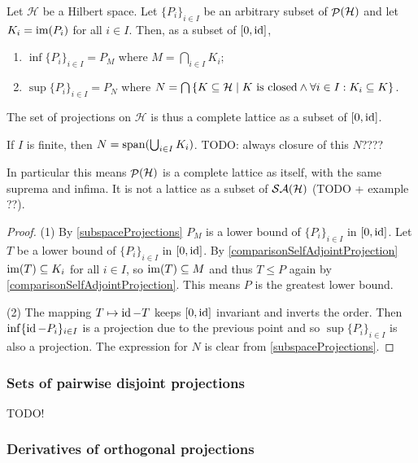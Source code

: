 \begin{proposition}
Let $\mathcal{H}$ be a Hilbert space. Let $\{P_i\}_{i\in I}$ be an arbitrary subset of $\mathop{\mathcal{P}}\nolimits(\mathcal{H})$ and let $K_i = \operatorname{im}(P_i)$ for all $i\in I$. Then, as a subset of $[0,\operatorname{id}]$,
\begin{enumerate}
\item $\inf \{P_i\}_{i\in I} = P_M$ where $M = \bigcap_{i\in I}K_i$;
\item $\sup \{P_i\}_{i\in I} = P_N$ where $N = \bigcap\left\{ K \subseteq \mathcal{H} \;\middle|\; \text{$K$ is closed} \land \forall i\in I: K_i \subseteq K \right\}$.
\end{enumerate}
The set of projections on $\mathcal{H}$ is thus a complete lattice as a subset of $[0,\operatorname{id}]$.

If $I$ is finite, then $N = \operatorname{span}(\bigcup_{i\in I}K_i)$. TODO: always closure of this $N$????
\end{proposition}
In particular this means $\mathop{\mathcal{P}}\nolimits(\mathcal{H})$ is a complete lattice as itself, with the same suprema and infima. It is not a lattice as a subset of $\mathop{\mathcal{SA}}\nolimits(\mathcal{H})$ (TODO + example ??).
\begin{proof}
(1) By \ref{subspaceProjections} $P_M$ is a lower bound of $\{P_i\}_{i\in I}$ in $[0,\operatorname{id}]$. Let $T$ be a lower bound of $\{P_i\}_{i\in I}$ in $[0,\operatorname{id}]$. By \ref{comparisonSelfAdjointProjection} $\operatorname{im}(T)\subseteq K_i$ for all $i\in I$, so $\operatorname{im}(T)\subseteq M$ and thus $T\leq P$ again by \ref{comparisonSelfAdjointProjection}. This means $P$ is the greatest lower bound.

(2) The mapping $T\mapsto \operatorname{id}-T$ keeps $[0,\operatorname{id}]$ invariant and inverts the order. Then $\inf \{\operatorname{id} - P_i\}_{i\in I}$ is a projection due to the previous point and so $\sup \{P_i\}_{i\in I}$ is also a projection. The expression for $N$ is clear from \ref{subspaceProjections}.
\end{proof}

\subsubsection{Sets of pairwise disjoint projections}
TODO!

\subsubsection{Derivatives of orthogonal projections}



